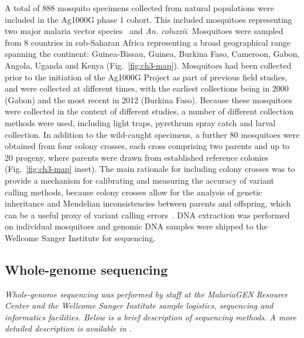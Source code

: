 \begin{refsection}
A total of 888 mosquito specimens collected from natural populations were included in the Ag1000G phase 1 cohort.
%
This included mosquitoes representing two major malaria vector species \agam\ and \textit{An. coluzzii}.
%
Mosquitoes were sampled from 8 countries in sub-Saharan Africa representing a broad geographical range spanning the continent: Guinea-Bissau, Guinea, Burkina Faso, Cameroon, Gabon, Angola, Uganda and Kenya (Fig.~\ref{fig:ch3-map}).
%
Mosquitoes had been collected prior to the initiation of the Ag1000G Project as part of previous field studies, and were collected at different times, with the earliest collections being in 2000 (Gabon) and the most recent in 2012 (Burkina Faso).
%
Because these mosquitoes were collected in the context of different studies, a number of different collection methods were used, including light traps, pyrethrum spray catch and larval collection.
%
In addition to the wild-caught specimens, a further 80 mosquitoes were obtained from four colony crosses, each cross comprising two parents and up to 20 progeny, where parents were drawn from established reference colonies (Fig.~\ref{fig:ch3-map} inset).
%
The main rationale for including colony crosses was to provide a mechanism for calibrating and measuring the accuracy of variant calling methods, because colony crosses allow for the analysis of genetic inheritance and Mendelian inconsistencies between parents and offspring, which can be a useful proxy of variant calling errors~\parencite{Saunders2007,Laurie2010,Pilipenko2014}.
%
DNA extraction was performed on individual mosquitoes and genomic DNA samples were shipped to the Wellcome Sanger Institute for sequencing.


\subsection{Whole-genome sequencing}\label{subsec:whole-genome-sequencing}


\textit{Whole-genome sequencing was performed by staff at the MalariaGEN Resource Center and the Wellcome Sanger Institute sample logistics, sequencing and informatics facilities. Below is a brief description of sequencing methods. A more detailed description is available in \textcite{Ag1000G2017}.}



\end{refsection}
